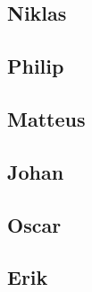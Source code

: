   \subsection{Niklas}
  
  \subsection{Philip}
  
  \subsection{Matteus}
  
  \subsection{Johan}
  
  \subsection{Oscar}
  
  \subsection{Erik}
  


